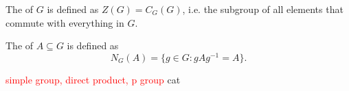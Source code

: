 \documentclass[class=report, crop=false]{standalone}
\begin{document}
\begin{definition}
    The  of $G$ is defined as $Z(G)=C_G(G)$, i.e. the subgroup of all elements that commute with everything in $G$.
\end{definition}

\begin{definition}
    The  of $A\subseteq G$ is defined as
    \[N_G(A)=\{g\in G: gAg^{-1} = A\}.\]
\end{definition}

\begin{definition}
    \textcolor{red}{simple group, direct product, p group}  cat
\end{definition}


\end{document}
